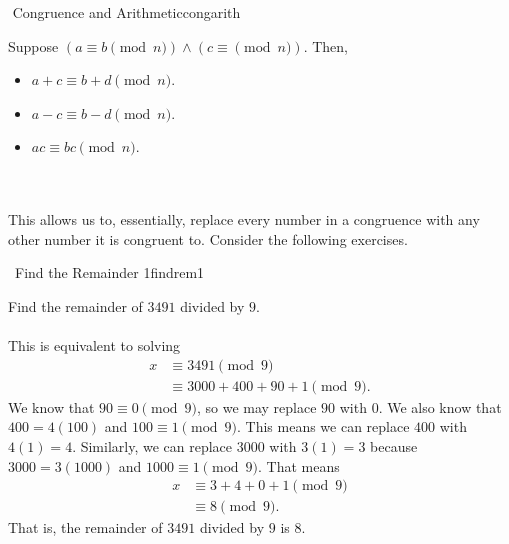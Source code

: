     \begin{theorem}{\Stop\,\,Congruence and Arithmetic}{congarith}
    
        Suppose \((a\equiv b\pmod n)\wedge (c\equiv \pmod n)\). Then,
        \begin{itemize}
            \item \(a+c\equiv b+d\pmod n\).
            \item \(a-c\equiv b-d\pmod n\).
            \item \(ac\equiv bc\pmod n\).
        \end{itemize}
    
    \end{theorem}
    \pagebreak
    \vphantom
    \\
    \\
    This allows us to, essentially, replace every number in a congruence with any other number it is congruent to. Consider the following exercises.
    \begin{exercise}{\Difficulty\,\Difficulty\,\,Find the Remainder 1}{findrem1}
    
        Find the remainder of \(3491\) divided by \(9\). 
        \\
        \\
        This is equivalent to solving
        \begin{align*}
            x&\equiv3491\pmod 9 \\
            &\equiv 3000+400+90+1\pmod 9.
        \end{align*}
        We know that \(90\equiv 0\pmod9\), so we may replace \(90\) with \(0\). We also know that \(400=4(100)\) and \(100\equiv1\pmod9\). This means we can replace \(400\) with \(4(1)=4\). Similarly, we can replace \(3000\) with \(3(1)=3\) because \(3000=3(1000)\) and \(1000\equiv1\pmod9\).
        That means
        \begin{align*}
            x&\equiv 3+4+0+1\pmod 9 \\
            &\equiv 8\pmod 9.
        \end{align*}
        That is, the remainder of \(3491\) divided by \(9\) is \(8\).
    
    \end{exercise}
